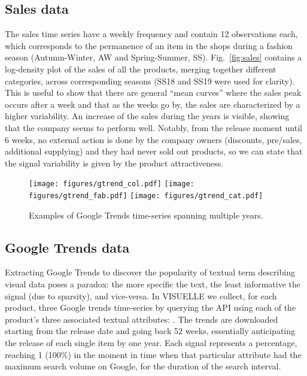 \documentclass{article}
\newcommand{\datasetname}[0] {VISUELLE}
\begin{document}
\subsection{Sales data}
The sales time series have a weekly frequency and contain 12 observations each, which corresponds to the permanence of an item in the shops during a fashion season (Autumn-Winter, AW and Spring-Summer, SS). Fig.~\ref{fig:sales} contains a log-density plot of the sales of all the products, merging together different categories, across corresponding seasons (SS18 and SS19 were used for clarity). This is useful to show that there are general ``mean curves'' where the sales peak occurs after a week and that as the weeks go by, the sales are characterized by a higher variability. An increase of the sales during the years is visible, showing that the company seems to perform well. Notably, from the release moment until 6 weeks, no external action is done by the company owners (discounts, pre/sales, additional supplying) and they had never sold out products, so we can state that the signal variability is given by the product attractiveness. 


\begin{figure*}[h]
    \centering
    \texttt{[image: figures/gtrend\_col.pdf]}\hfill
    \texttt{[image: figures/gtrend\_fab.pdf]}\hfill
    \texttt{[image: figures/gtrend\_cat.pdf]}\hfill
    \caption{Examples of Google Trends time-series spanning multiple years.}
    \label{fig:structuredTrend}
\end{figure*}

\subsection{Google Trends data}\label{sec:gtrend_collection}
Extracting Google Trends to discover the popularity of textual term describing visual data poses a paradox: the more specific the text, the least informative the signal (due to sparsity), and vice-versa. In \datasetname{} we collect, for each product, three Google trends time-series by querying the API using each of the product's three associated textual attributes: . The trends are downloaded starting from the release date and going back 52 weeks, essentially anticipating the release of each single item by one year. Each signal represents a percentage, reaching 1 (100\%) in the moment in time when that particular attribute had the maximum search volume on Google, for the duration of the search interval. 
\end{document}
